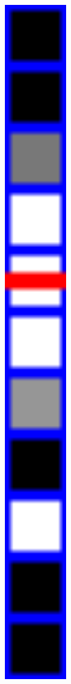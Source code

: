 \documentclass[a4paper,10pt]{scrartcl}
\begin{document}
\begin{minipage}{\textwidth}
\begin{minipage}{0.04\textwidth}
\includegraphics[width=0.65\textwidth]{include/line_detect_threshold.png}
\end{minipage}
\end{minipage}
\end{document}
